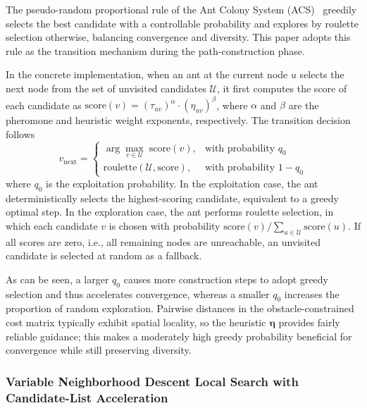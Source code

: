 The pseudo-random proportional rule of the Ant Colony System (ACS)~\textcolor{blue}{\cite{ref22}} greedily selects the best candidate with a controllable probability and explores by roulette selection otherwise, balancing convergence and diversity. This paper adopts this rule as the transition mechanism during the path-construction phase.

In the concrete implementation, when an ant at the current node $u$ selects the next node from the set of unvisited candidates $\mathcal{U}$, it first computes the score of each candidate as $\mathrm{score}(v) = (\tau_{uv})^{\alpha} \cdot (\eta_{uv})^{\beta}$, where $\alpha$ and $\beta$ are the pheromone and heuristic weight exponents, respectively. The transition decision follows
\begin{equation}
v_{\mathrm{next}} =
\begin{cases}
\arg\max_{v \in \mathcal{U}} \; \mathrm{score}(v), & \text{with probability } q_0 \\
\mathrm{roulette}(\mathcal{U}, \mathrm{score}), & \text{with probability } 1 - q_0
\end{cases}
\label{eq:trans}
\end{equation}
where $q_0$ is the exploitation probability. In the exploitation case, the ant deterministically selects the highest-scoring candidate, equivalent to a greedy optimal step. In the exploration case, the ant performs roulette selection, in which each candidate $v$ is chosen with probability $\mathrm{score}(v) / \sum_{u \in \mathcal{U}} \mathrm{score}(u)$. If all scores are zero, i.e., all remaining nodes are unreachable, an unvisited candidate is selected at random as a fallback.

As can be seen, a larger $q_0$ causes more construction steps to adopt greedy selection and thus accelerates convergence, whereas a smaller $q_0$ increases the proportion of random exploration. Pairwise distances in the obstacle-constrained cost matrix typically exhibit spatial locality, so the heuristic $\bm{\eta}$ provides fairly reliable guidance; this makes a moderately high greedy probability beneficial for convergence while still preserving diversity.

\subsubsection{Variable Neighborhood Descent Local Search with Candidate-List Acceleration}
\label{subsec:vnd}

